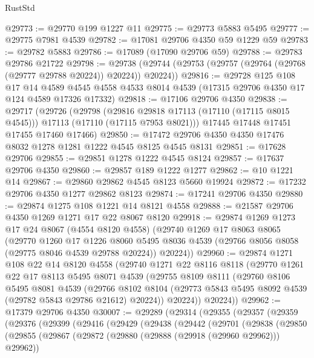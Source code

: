 \begin{lexlean}{RustStd}
\begin{coremodule}
@29773 := @29770 @199 @1227 @11
@29775 := @29773 @5883 @5495
@29777 := @29775 @7981 @4539
@29782 := @17081 @29706 @4350 @59 @1229 @59
@29783 := @29782 @5883
@29786 := @17089 (@17090 @29706 @59)
@29788 := @29783 @29786 @21722
@29798 := @29738 (@29744 (@29753 (@29757 (@29764 (@29768 (@29777 @29788 @20224)) @20224)) @20224))
@29816 := @29728
    @125
    @108
    @17
    @14
    @4589
    @4545
    @4558
    @4533
    @8014
    @4539
    (@17315 @29706 @4350 @17 @124 @4589 @17326 @17332)
@29818 := @17106 @29706 @4350
@29838 := @29717
    (@29726
      (@29798
        (@29816 @29818 @17113 (@17110 (@17115 @8015 @4545)))
        @17113
        (@17110 (@17115 @7953 @8021)))
      @17445
      @17448
      @17451
      @17455
      @17460
      @17466)
@29850 := @17472 @29706 @4350 @4350 @17476 @8032 @1278 @1281 @1222 @4545 @8125 @4545 @8131
@29851 := @17628 @29706
@29855 := @29851 @1278 @1222 @4545 @8124
@29857 := @17637 @29706 @4350
@29860 := @29857 @189 @1222 @1277
@29862 := @10 @1221 @14
@29867 := @29860 @29862 @4545 @8123 @5660 @19924
@29872 := @17232 @29706 @4350 @1277 @29862 @8123
@29874 := @17241 @29706 @4350
@29880 := @29874 @1275 @108 @1221 @14 @8121 @4558
@29888 := @21587 @29706 @4350 @1269 @1271 @17 @22 @8067 @8120
@29918 := @29874
    @1269
    @1273
    @17
    @24
    @8067
    (@4554 @8120 @4558)
    (@29740
      @1269
      @17
      @8063
      @8065
      (@29770
        @1260
        @17
        @1226
        @8060
        @5495
        @8036
        @4539
        (@29766 @8056 @8058 (@29775 @8046 @4539 @29788 @20224))
        @20224))
@29960 := @29874
    @1271
    @108
    @22
    @14
    @8120
    @4558
    (@29740
      @1271
      @22
      @8116
      @8118
      (@29770
        @1261
        @22
        @17
        @8113
        @5495
        @8071
        @4539
        (@29755
          @8109
          @8111
          (@29760
            @8106
            @5495
            @8081
            @4539
            (@29766
              @8102
              @8104
              (@29773 @5843 @5495 @8092 @4539 (@29782 @5843 @29786 @21612) @20224))
            @20224))
        @20224))
@29962 := @17379 @29706 @4350
@30007 := @29289
    (@29314
      (@29355
        (@29357
          (@29359
            (@29376
              (@29399
                (@29416
                  (@29429
                    (@29438
                      (@29442
                        (@29701
                          (@29838
                            (@29850
                              (@29855
                                (@29867
                                  (@29872 (@29880 (@29888 (@29918 (@29960 @29962))) @29962))

\end{coremodule}
\end{lexlean}
